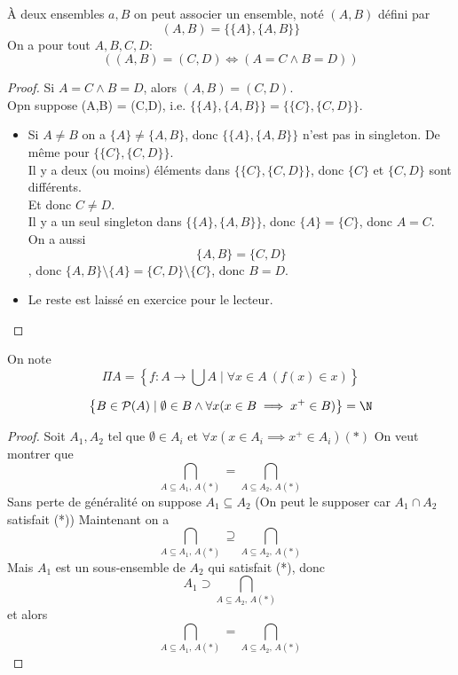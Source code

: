 \begin{prop}
	À deux ensembles $a, B$ on peut associer un ensemble, noté $(A,B)$ défini par
	$$ (A,B) = \{ \{A\}, \{A,B\} \}$$
	On a pour tout $A, B, C, D$:
	$$ \left((A, B) = (C,D) \iff (A = C \land B = D)\right)$$
\end{prop}

\begin{proof}
	Si $A = C \land B = D$, alors $(A,B) = (C,D)$.\\
	Opn suppose (A,B) = (C,D), i.e. $\{\{A\}, \{A,B\}\} = \{\{C\}, \{C,D\}\}$.\\

	\begin{itemize}
		\item Si $A \neq B$ on a $\{A\} \neq \{A,B\}$, donc $\{\{A\}, \{A,B\}\}$ n'est pas in singleton.
		      De même pour $\{\{C\}, \{C,D\}\}$.\\
		      Il y a deux (ou moins) éléments dans $\{\{C\}, \{C,D\}\}$, donc $\{C\}$ et  $\{C,D\}$ sont différents.\\
		      Et donc $C \neq D$. \\
		      Il y a un seul singleton dans $\{\{A\}, \{A,B\}\}$, donc $\{A\} = \{C\}$, donc $A = C$.\\
		      On a aussi $$\{A,B\} = \{C,D\}$$, donc $\{A, B\}\setminus \{A\} = \{C,D\}\setminus \{C\}$, donc $B = D$.
		\item Le reste est laissé en exercice pour le lecteur.
	\end{itemize}
\end{proof}


On note
$$ \Pi A = \left\{ f: A \to \bigcup A \mid \forall x \in A \ (f(x) \in x) \right\}$$


\begin{prop}
	$$ \left\{ B \in \mathcal{P}(A) \mid \emptyset \in B \land \forall x (x \in B \implies x^+ \in B) \right\} = \N $$
\end{prop}

\begin{proof}
	Soit $A_1, A_2$ tel que $\emptyset \in A_i$ et
	$ \forall x (x \in A_i \implies x^+ \in A_i) (*)$
	On veut montrer que
	$$ \bigcap_{A\subseteq A_1, \, A (*)} = \bigcap_{A\subseteq A_2, \, A(*)} $$
	Sans perte de généralité on suppose $A_1 \subseteq A_2$ (On peut le supposer car
	$A_1 \cap A_2$ satisfait (*))
	Maintenant on a
	$$ \bigcap_{A\subseteq A_1, \, A (*)} \supseteq \bigcap_{A\subseteq A_2, \, A(*)} $$
	Mais $A_1$ est un sous-ensemble de $A_2$ qui satisfait (*), donc
	$$A_1 \supset \bigcap_{A\subseteq A_2, \, A(*)} $$
	et alors
	$$ \bigcap_{A\subseteq A_1, \, A (*)} = \bigcap_{A\subseteq A_2, \, A(*)} $$
\end{proof}


